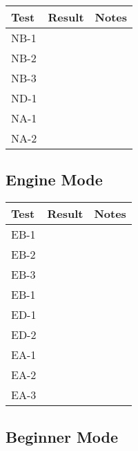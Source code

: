 \documentclass[12pt, titlepage]{article}
\begin{document}
\begin{table}[H]
  \centering
      \setlength{\leftmargini}{0.4cm}
      \begin{tabular}{| >{\centering\arraybackslash}m{3cm} | 
        >{\centering\arraybackslash}m{4cm} | 
        >{\centering\arraybackslash}m{6cm} |}
      \hline
      \rowcolor[gray]{0.9}
      Test & Result & Notes\\
      \hline
      NB-1 &  & \\
      \hline
      NB-2 &  & \\
      \hline
      NB-3 &  & \\
      \hline
      ND-1 &  & \\
      \hline
      NA-1 &  & \\
      \hline
      NA-2 &  & \\
      \hline
      \end{tabular}
  \label{Table}
  \end{table}

\subsection{Engine Mode}

\begin{table}[H]
  \centering
      \setlength{\leftmargini}{0.4cm}
      \begin{tabular}{| >{\centering\arraybackslash}m{3cm} | 
        >{\centering\arraybackslash}m{4cm} | 
        >{\centering\arraybackslash}m{6cm} |}
      \hline
      \rowcolor[gray]{0.9}
      Test & Result & Notes\\
      \hline
      EB-1 &  & \\
      \hline
      EB-2 &  & \\
      \hline
      EB-3 &  & \\
      \hline
      EB-1 &  & \\
      \hline
      ED-1 &  & \\
      \hline
      ED-2 &  & \\
      \hline
      EA-1 &  & \\
      \hline
      EA-2 &  & \\
      \hline
      EA-3 &  & \\
      \hline
      \end{tabular}
  \label{Table}
  \end{table}

\subsection{Beginner Mode}
\end{document}
